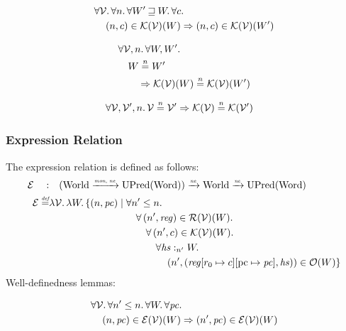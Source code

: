 \documentclass[a4paper]{article}
\newcommand{\update}[2]{[#1 \mapsto #2]}
\newcommand{\monnefun}{\xrightarrow{\textit{\tiny{mon, ne}}}}
\newcommand{\nefun}{\xrightarrow{\textit{\tiny{ne}}}}
\newcommand{\defeq}{\stackrel{\textit{\tiny{def}}}{=}}
\newcommand{\nequal}[1][n]{\stackrel{\tiny{#1}}{=}}
\newcommand{\var}[1]{\mathit{#1}}
\newcommand{\hs}{\var{hs}}
\newcommand{\pc}{\mathit{pc}}
\newcommand{\pcreg}{\mathrm{pc}}
\newcommand{\reg}{\var{reg}}
\newcommand{\heap}{\var{heap}}
\newcommand{\future}{\mathbin{\sqsupseteq}}
\newcommand{\heapSat}[3][\heap]{#1 :_{#2} #3}
\newcommand{\asmType}{\plaindom{AsmType}}
\newcommand{\plaindom}[1]{\mathrm{#1}}
\newcommand{\Words}{\plaindom{Word}}
\newcommand{\Worlds}{\plaindom{World}}
\newcommand{\UPred}[1]{\plaindom{UPred}(#1)}
\newcommand{\intr}[2]{\mathcal{#1}}
\newcommand{\valueintr}[1]{\intr{V}{#1}}
\newcommand{\exprintr}[1]{\intr{E}{#1}}
\newcommand{\contintr}[1]{\intr{K}{#1}}
\newcommand{\regintr}[1]{\intr{R}{#1}}
\newcommand{\stdvr}{\valueintr{\asmType}}
\newcommand{\stder}{\exprintr{\asmType}}
\newcommand{\stdrr}{\regintr{\asmType}}
\newcommand{\stdkr}{\contintr{\asmType}}
\newcommand{\observations}{\mathcal{O}}
\newcommand{\npair}[2][n]{\left(#1,#2 \right)}
\begin{document}
\begin{lemma}
\label{lem:stdkr-mono-worlds}
  \begin{align*}
    &\forall \stdvr \ldotp \forall n \ldotp \forall W' \future W \ldotp \forall c \ldotp\\
    &\quad \npair{c} \in \stdkr(\stdvr)(W) \Rightarrow \npair{c} \in \stdkr(\stdvr)(W')
  \end{align*}
\end{lemma}

\begin{lemma}
  \label{lem:stdkr-ne-worlds}
  \begin{align*}
    &\forall \stdvr, n \ldotp \forall W, W' \ldotp\\
    &\quad W \nequal W' \\
    &\qquad \Rightarrow \stdkr(\stdvr)(W) \nequal \stdkr(\stdvr)(W')
  \end{align*}
\end{lemma}

\begin{lemma}
\label{lem:stdkr-ne-vr}
\begin{align*}
  &\forall \stdvr, \stdvr', n \ldotp \stdvr \nequal \stdvr' \Rightarrow \stdkr(\stdvr) \nequal \stdkr(\stdvr')
\end{align*}
\end{lemma}


\subsubsection{Expression Relation}
\label{subsubsec:expression-relation}
The expression relation is defined as follows:
\begin{align*}
  \stder \quad : & \quad  (\Worlds \monnefun \UPred{\Words}) \nefun \Worlds \nefun \UPred{\Words} \\%
  \stder \defeq & \lambda \stdvr \ldotp \lambda W \ldotp \{ \npair{\pc} \mid 
  \begin{aligned}[t]
    & \forall n' \leq n \ldotp\\
    & \quad \forall \npair[n']{\reg} \in \stdrr(\stdvr)(W) \ldotp \\
    & \quad \quad \forall \npair[n']{c} \in \stdkr(\stdvr)(W) \ldotp \\
    & \quad \qquad  \forall \heapSat[\hs]{n'}{W} \ldotp \\
    & \quad \qquad \quad \npair[n']{(\reg\update{r_0}{c}\update{\pcreg}{\pc},\hs)} \in \observations(W) \}
  \end{aligned}
\end{align*}
Well-definedness lemmas:
\begin{lemma}
\label{lem:stder-dc}
  \begin{align*}
    & \forall \stdvr \ldotp \forall n' \leq n \ldotp \forall W \ldotp \forall \pc \ldotp\\
    & \quad \npair{\pc} \in \stder(\stdvr)(W) \Rightarrow \npair[n']{\pc} \in \stder(\stdvr)(W) 
 \end{align*}
\end{lemma}
\end{document}
